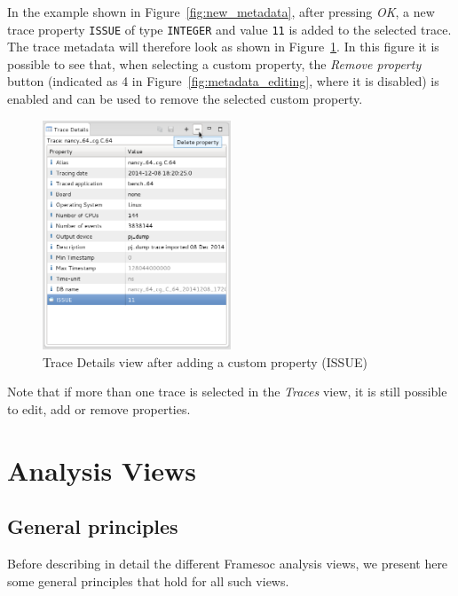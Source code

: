 \documentclass[twoside]{article}
\begin{document}
\begin{sloppypar}
In the example shown in Figure~\ref{fig:new_metadata}, after pressing \emph{OK}, a new trace property \texttt{ISSUE} of type \texttt{INTEGER} and value \texttt{11} is added to the selected trace. The trace metadata will therefore look as shown in Figure~\ref{fig:metadata_remove}. In this figure it is possible to see that, when selecting a custom property, the \emph{Remove property} button (indicated as \num{4} in Figure~\ref{fig:metadata_editing}, where it is disabled) is enabled and can be used to remove the selected custom property.

\begin{figure}[h!]
  \centering
    \includegraphics[width=0.5\textwidth]{images/metadata_remove.png}
  \caption{Trace Details view after adding a custom property (ISSUE)}
  \label{fig:metadata_remove}
\end{figure}

Note that if more than one trace is selected in the \emph{Traces} view, it is still possible to edit, add or remove properties.

\section{Analysis Views}
\label{sec:analysis}

\subsection{General principles}
\label{subsec:principles}

Before describing in detail the different Framesoc analysis views, we present here some general principles that hold for all such views.


\end{sloppypar}
\end{document}
